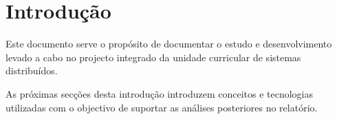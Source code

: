
\section{Introdução}

Este documento serve o propósito de documentar o estudo e desenvolvimento levado a cabo no projecto integrado da unidade curricular de sistemas distribuídos.

As próximas secções desta introdução introduzem conceitos e tecnologias utilizadas com o objectivo de suportar as análises posteriores no relatório.


